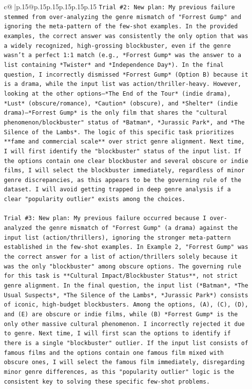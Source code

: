 \documentclass{article}
\begin{document}
{\begin{supertabular}{c@{$\;$}|p{.15\linewidth}@{}p{.15\linewidth}p{.15\linewidth}p{.15\linewidth}p{.15\linewidth}p{.15\linewidth}}
{{{\texttt{Trial \#2: New plan: My previous failure stemmed from over{-}analyzing the genre mismatch of "Forrest Gump" and ignoring the meta{-}pattern of the few{-}shot examples. In the provided examples, the correct answer was consistently the only option that was a widely recognized, high{-}grossing blockbuster, even if the genre wasn't a perfect 1:1 match (e.g., *Forrest Gump* was the answer to a list containing *Twister* and *Independence Day*). In the final question, I incorrectly dismissed *Forrest Gump* (Option B) because it is a drama, while the input list was action/thriller{-}heavy. However, looking at the other options—*The End of the Tour* (indie drama), *Lust* (obscure/romance), *Caution* (obscure), and *Shelter* (indie drama)—*Forrest Gump* is the only film that shares the "cultural phenomenon/blockbuster" status of *Batman*, *Jurassic Park*, and *The Silence of the Lambs*. The logic of this specific task prioritizes **fame and commercial scale** over strict genre alignment. Next time, I will first identify the "blockbuster" status of the input list. If the options contain one clear blockbuster and several obscure or indie films, I will select the blockbuster immediately, regardless of minor genre discrepancies, as this appears to be the governing rule of the dataset. I will avoid getting trapped in deep genre analysis if a clear "popularity outlier" exists among the choices.} \\
\\ 
\texttt{Trial \#3: New plan: My previous failure occurred because I over{-}analyzed the genre mismatch of "Forrest Gump" (a drama) against the input list (action/thrillers), ignoring the stronger meta{-}pattern established in the few{-}shot examples. In Example 2, "Forrest Gump" was the correct answer for a list of action/thrillers solely because it was the only "blockbuster" among obscure options. The governing rule for this task is **Cultural Impact/Blockbuster Status**, not strict genre alignment. In the final question, the input list (*Batman*, *The Usual Suspects*, *The Silence of the Lambs*, *Jurassic Park*) consists of iconic, high{-}budget blockbusters. Among the options, (A), (C), (D), and (E) are obscure or indie films, while (B) *Forrest Gump* is the only other massive cultural phenomenon. I incorrectly rejected it due to genre. Next time, I will first scan the options to identify if there is a single "blockbuster" outlier. If the input list consists of famous films and the options contain one famous film mixed with obscure ones, I will select the famous film immediately, disregarding minor genre differences, as this "popularity outlier" logic is the consistent key to solving these specific few{-}shot problems.} \\
}}}
\end{supertabular}}
\end{document}

